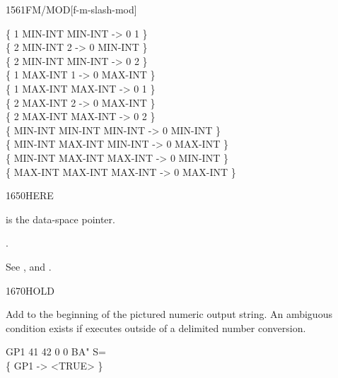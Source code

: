 \begin{worddef}{1561}{FM/MOD}[f-m-slash-mod]
\begin{defer}
		\{       1 MIN-INT  MIN-INT  ->  0       1 \} \\
		\{       2 MIN-INT        2  ->  0 MIN-INT \} \\
		\{       2 MIN-INT  MIN-INT  ->  0       2 \} \\
		\{       1 MAX-INT        1  ->  0 MAX-INT \} \\
		\{       1 MAX-INT  MAX-INT  ->  0       1 \} \\
		\{       2 MAX-INT        2  ->  0 MAX-INT \} \\
		\{       2 MAX-INT  MAX-INT  ->  0       2 \} \\
		\{ MIN-INT MIN-INT  MIN-INT  ->  0 MIN-INT \} \\
		\{ MIN-INT MAX-INT  MIN-INT  ->  0 MAX-INT \} \\
		\{ MIN-INT MAX-INT  MAX-INT  ->  0 MIN-INT \} \\
		\{ MAX-INT MAX-INT  MAX-INT  ->  0 MAX-INT \}
	\end{defer}
\end{worddef}


\begin{worddef}{1650}{HERE}
\item {}

	 is the data-space pointer.

\see {}.

	\begin{defer}
	\testing*
		See ,
			 and
			.
	\end{defer}
\end{worddef}


\begin{worddef}{1670}{HOLD}
\item {}

	Add  to the beginning of the pictured numeric output
	string. An ambiguous condition exists if  executes
	outside of a   delimited number
	conversion.

	\begin{defer}
	\testing
		\word{:} GP1   41  42  0 0   BA" S= \word{;} \\
		\{ GP1 -> <TRUE> \}
	\end{defer}
\end{worddef}


